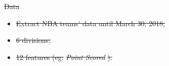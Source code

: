 \documentclass[
 size=14pt,
 paper=smartboard,  %
 mode=present, 		%
 display=slides, 	%
 style=tuliplab,  	%
 pauseslide,
 fleqn,leqno]{powerdot}
\providecommand{\DIFdeltex}[1]{{\protect\color{red}\sout{#1}}}                      %
\providecommand{\DIFdelbegin}{} %
\providecommand{\DIFdelend}{} %
\providecommand{\DIFdel}[1]{\texorpdfstring{\DIFdeltex{#1}}{}} %
\newcommand{\DIFscaledelfig}{0.5}
\newlength{\DIFdelgraphicswidth} %
\newlength{\DIFdelgraphicsheight} %
\newcommand{\DIFdelincludegraphics}[2][]{%
\sbox{\DIFdelgraphicsbox}{\DIFOincludegraphics[#1]{#2}}%
\settoboxwidth{\DIFdelgraphicswidth}{\DIFdelgraphicsbox} %
\settoboxtotalheight{\DIFdelgraphicsheight}{\DIFdelgraphicsbox} %
\scalebox{\DIFscaledelfig}{%
\parbox[b]{\DIFdelgraphicswidth}{\usebox{\DIFdelgraphicsbox}\\[-\baselineskip] \rule{\DIFdelgraphicswidth}{0em}}\llap{\resizebox{\DIFdelgraphicswidth}{\DIFdelgraphicsheight}{%
\setlength{\unitlength}{\DIFdelgraphicswidth}%
\begin{picture}(1,1)%
\thicklines\linethickness{2pt} %
{\color[rgb]{1,0,0}\put(0,0){\framebox(1,1){}}}%
{\color[rgb]{1,0,0}\put(0,0){\line( 1,1){1}}}%
{\color[rgb]{1,0,0}\put(0,1){\line(1,-1){1}}}%
\end{picture}%
}\hspace*{3pt}}} %
} %
\DeclareRobustCommand{\DIFdelbegin}{\DIFOdelbegin \let\includegraphics\DIFdelincludegraphics} %
\DeclareRobustCommand{\DIFdelend}{\DIFOaddend \let\includegraphics\DIFOincludegraphics} %
\begin{document}
\DIFdelbegin %
\DIFdel{Data
}\DIFdelend %

\DIFdelbegin %
\begin{itemize}%
\item%
\DIFdel{Extract NBA teams' data until March 30, 2018;
 }%
\item%
\DIFdel{6 divisions;
 }%
\item%
\DIFdel{12 features (eg: }\emph{\DIFdel{Point Scored}}%
\DIFdel{).
}
\end{itemize}%
\DIFdelend %
\end{document}
